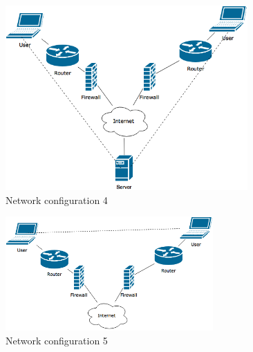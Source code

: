 \documentclass[paper=a4, fontsize=11pt]{scrartcl} %
\numberwithin{equation}{section} %
\numberwithin{figure}{section} %
\numberwithin{table}{section} %
\begin{document}
\begin{figure}[ht!]
	\centering
	\includegraphics[width=350px]{network-config-4.png}
	\caption{Network configuration 4}
\end{figure}

\begin{figure}[ht!]
	\centering
	\includegraphics[width=300px]{network-config-5.png}
	\caption{Network configuration 5}
\end{figure}
\end{document}
